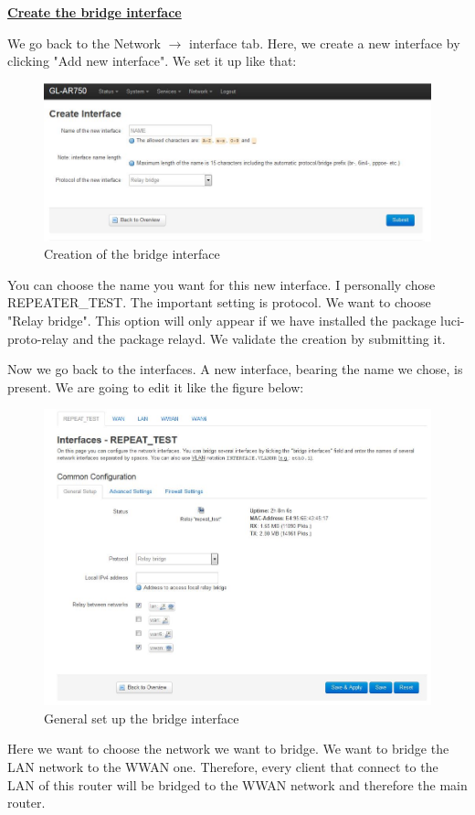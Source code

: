 \hfill \break \underline{\textbf{Create the bridge interface}}

We go back to the Network $\rightarrow$ interface tab. Here, we create a new interface by clicking "Add new interface".
We set it up like that:

\begin{figure}[H]
\begin{center}
\includegraphics[width=\columnwidth]{image/interface2.jpg}%
\caption{Creation of the bridge interface}%
\label{figure:interface2}%
\end{center}
\end{figure}

You can choose the name you want for this new interface. I personally chose REPEATER\_TEST. The important setting is protocol. We want to choose "Relay bridge". This option will only appear if we have installed the package luci-proto-relay and the package relayd.
We validate the creation by submitting it.

Now we go back to the interfaces. A new interface, bearing the name we chose, is present. We are going to edit it like the figure below:
\begin{figure}[H]
\begin{center}
\includegraphics[width=\columnwidth]{image/interface3.jpg}%
\caption{General set up the bridge interface}%
\label{figure:interface3}%
\end{center}
\end{figure}
Here we want to choose the network we want to bridge. We want to bridge the LAN network to the WWAN one. Therefore, every client that connect to the LAN of this router will be bridged to the WWAN network and therefore the main router.

